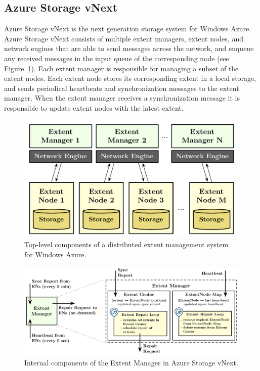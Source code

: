
\subsection{Azure Storage vNext}
\label{sec:cases:azurestore}

Azure Storage vNext is the next generation storage system for Windows Azure. Azure Storage vNext consists of multiple extent managers, extent nodes, and network engines that are able to send messages across the network, and enqueue any received messages in the input queue of the corresponding node (see Figure~\ref{fig:azurestore}). Each extent manager is responsible for managing a subset of the extent nodes. Each extent node stores its corresponding extent in a local storage, and sends periodical heartbeats and synchronization messages to the extent manager. When the extent manager receives a synchronization message it is responsible to update extent nodes with the latest extent.

\begin{figure}[t]
\centering
\includegraphics[width=\linewidth]{img/azurestore}
\caption{Top-level components of a distributed extent management system for Windows Azure.}
\label{fig:azurestore}
\end{figure}

\begin{figure}[t]
\centering
\includegraphics[width=\linewidth]{img/extent_manager}
\caption{Internal components of the Extent Manager in Azure Storage vNext.}
\label{fig:extentmanager}
\end{figure}

